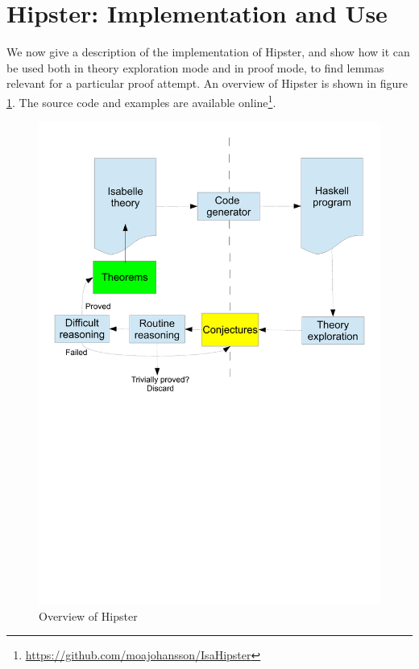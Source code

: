 \section{Hipster: Implementation and Use}
\label{sec:hipster}

We now give a description of the implementation of Hipster, and show how it can be used both in theory exploration mode and in proof mode, to find lemmas relevant for a particular proof attempt. An overview of Hipster is shown in figure \ref{fig:hipster}. The source code and examples are available online\footnote{\url{https://github.com/moajohansson/IsaHipster}}.

\begin{figure}[htbp]
\begin{center}
\includegraphics[scale=0.45]{hipster}

\caption{Overview of Hipster}
\label{fig:hipster}
\end{center}
\end{figure}

